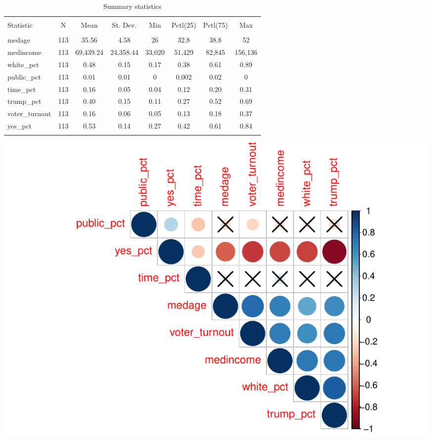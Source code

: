 \documentclass[
]{article}
\begin{document}
\begin{table}[!htbp] \centering 
  \caption{Summary statistics} 
  \label{summaryStats} 
\begin{tabular}{@{\extracolsep{5pt}}lccccccc} 
\\[-1.8ex]\hline 
\hline \\[-1.8ex] 
Statistic & \multicolumn{1}{c}{N} & \multicolumn{1}{c}{Mean} & \multicolumn{1}{c}{St. Dev.} & \multicolumn{1}{c}{Min} & \multicolumn{1}{c}{Pctl(25)} & \multicolumn{1}{c}{Pctl(75)} & \multicolumn{1}{c}{Max} \\ 
\hline \\[-1.8ex] 
medage & 113 & 35.56 & 4.58 & 26 & 32.8 & 38.8 & 52 \\ 
medincome & 113 & 69,439.24 & 24,358.44 & 33,020 & 51,429 & 82,845 & 156,136 \\ 
white\_pct & 113 & 0.48 & 0.15 & 0.17 & 0.38 & 0.61 & 0.89 \\ 
public\_pct & 113 & 0.01 & 0.01 & 0 & 0.002 & 0.02 & 0 \\ 
time\_pct & 113 & 0.16 & 0.05 & 0.04 & 0.12 & 0.20 & 0.31 \\ 
trump\_pct & 113 & 0.40 & 0.15 & 0.11 & 0.27 & 0.52 & 0.69 \\ 
voter\_turnout & 113 & 0.16 & 0.06 & 0.05 & 0.13 & 0.18 & 0.37 \\ 
yes\_pct & 113 & 0.53 & 0.14 & 0.27 & 0.42 & 0.61 & 0.84 \\ 
\hline \\[-1.8ex] 
\end{tabular} 
\end{table}

\includegraphics{Zhong_paper_files/figure-latex/create correlation matrix-1.pdf}
\end{document}
